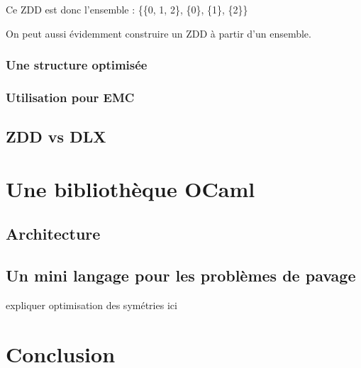 \documentclass[a4paper]{article}
\begin{document}
Ce ZDD est donc l'ensemble : \{\{0, 1, 2\}, \{0\}, \{1\}, \{2\}\}

On peut aussi évidemment construire un ZDD à partir d'un ensemble.


\subsubsection{Une structure optimisée}

\subsubsection{Utilisation pour EMC}



\subsection{ZDD vs DLX}


\section{Une bibliothèque OCaml}

\subsection{Architecture}

\subsection{Un mini langage pour les problèmes de pavage}

 expliquer optimisation des symétries ici

\section{Conclusion}




\end{document}
